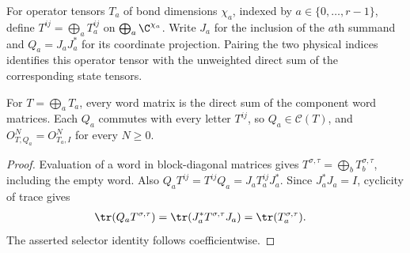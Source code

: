 \begin{definition}
    \label{def:glm_boundary_block_sum}
    \leanok
    For operator tensors $T_a$ of bond dimensions $\chi_a$, indexed by
    $a\in\{0,\ldots,r-1\}$, define $T^{ij}=\bigoplus_aT_a^{ij}$ on
    $\bigoplus_a\C^{\chi_a}$. Write $J_a$ for the inclusion of the
    $a$th summand and $Q_a=J_aJ_a^*$ for its coordinate projection.
    Pairing the two physical indices identifies this operator tensor
    with the unweighted direct sum of the corresponding state tensors.
\end{definition}

\begin{lemma}
    \label{thm:glm_boundary_block_selector}
    \leanok
    For $T=\bigoplus_aT_a$, every word matrix is the direct sum of the
    component word matrices. Each $Q_a$ commutes with every letter
    $T^{ij}$, so $Q_a\in\mathcal C(T)$, and
    $O^N_{T,Q_a}=O^N_{T_a,I}$ for every $N\geq0$.
\end{lemma}
\begin{proof}
    \leanok
    Evaluation of a word in block-diagonal matrices gives
    $T^{\sigma,\tau}=\bigoplus_bT_b^{\sigma,\tau}$, including the
    empty word. Also $Q_aT^{ij}=T^{ij}Q_a=J_aT_a^{ij}J_a^*$.
    Since $J_a^*J_a=I$, cyclicity of trace gives
    \begin{align}
        \tr(Q_aT^{\sigma,\tau})
         & =\tr(J_a^*T^{\sigma,\tau}J_a)
        =\tr(T_a^{\sigma,\tau}).
        \notag
    \end{align}
    The asserted selector identity follows coefficientwise.
\end{proof}

